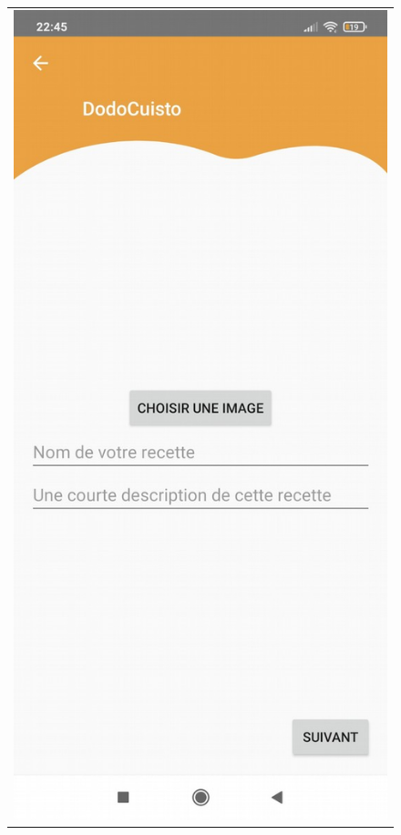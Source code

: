 \documentclass{article}
\begin{document}
\begin{figure}
\begin{tabular}{@{}c@{}}
        \includegraphics[scale=0.2]{add_image.png}
    \end{tabular}
    \begin{tabular}{@{}c@{}}

\end{tabular}
\end{figure}
\end{document}
